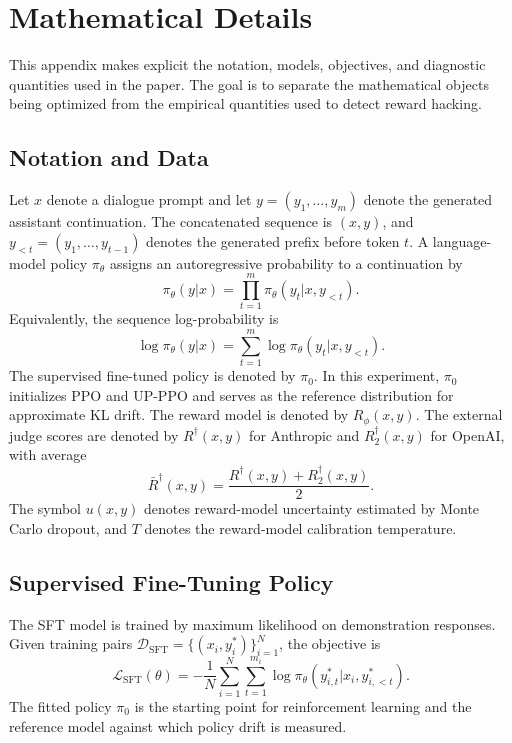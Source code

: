 \documentclass[11pt]{article}
\newcommand{\Rphi}{R_{\phi}}
\newcommand{\Rdag}{R^{\dagger}}
\newcommand{\Rtwo}{R^{\dagger}_2}
\begin{document}
\section{Mathematical Details}
This appendix makes explicit the notation, models, objectives, and diagnostic quantities used in the paper. The goal is to separate the mathematical objects being optimized from the empirical quantities used to detect reward hacking.

\subsection{Notation and Data}
Let $x$ denote a dialogue prompt and let $y=(y_1,\ldots,y_m)$ denote the generated assistant continuation. The concatenated sequence is $(x,y)$, and $y_{<t}=(y_1,\ldots,y_{t-1})$ denotes the generated prefix before token $t$. A language-model policy $\pi_\theta$ assigns an autoregressive probability to a continuation by
\begin{equation}
    \pi_\theta(y|x)=\prod_{t=1}^{m}\pi_\theta(y_t|x,y_{<t}).
\end{equation}
Equivalently, the sequence log-probability is
\begin{equation}
    \log \pi_\theta(y|x)=\sum_{t=1}^{m}\log \pi_\theta(y_t|x,y_{<t}).
\end{equation}
The supervised fine-tuned policy is denoted by $\pi_0$. In this experiment, $\pi_0$ initializes PPO and UP-PPO and serves as the reference distribution for approximate KL drift. The reward model is denoted by $\Rphi(x,y)$. The external judge scores are denoted by $\Rdag(x,y)$ for Anthropic and $\Rtwo(x,y)$ for OpenAI, with average
\begin{equation}
    \bar R^\dagger(x,y)=\frac{\Rdag(x,y)+\Rtwo(x,y)}{2}.
\end{equation}
The symbol $u(x,y)$ denotes reward-model uncertainty estimated by Monte Carlo dropout, and $T$ denotes the reward-model calibration temperature.

\subsection{Supervised Fine-Tuning Policy}
The SFT model is trained by maximum likelihood on demonstration responses. Given training pairs $\mathcal{D}_{\mathrm{SFT}}=\{(x_i,y_i^*)\}_{i=1}^{N}$, the objective is
\begin{equation}
    \mathcal{L}_{\mathrm{SFT}}(\theta)
    =-\frac{1}{N}\sum_{i=1}^{N}\sum_{t=1}^{m_i}
      \log \pi_\theta(y^*_{i,t}|x_i,y^*_{i,<t}).
\end{equation}
The fitted policy $\pi_0$ is the starting point for reinforcement learning and the reference model against which policy drift is measured.
\end{document}
